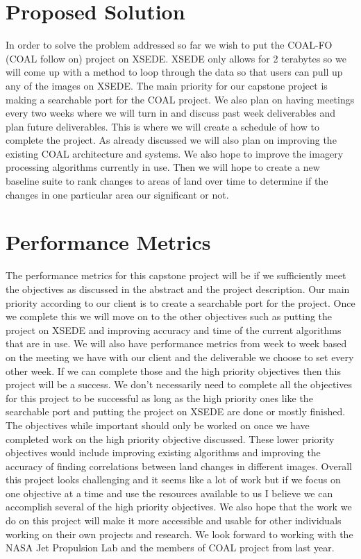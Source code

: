 \documentclass{article}
\begin{document}
\section*{Proposed Solution}
In order to solve the problem addressed so far we wish to put the COAL-FO (COAL
follow on) project on XSEDE. XSEDE only allows for 2 terabytes so we will come
up with a method to loop through the data so that users can pull up any of the
images on XSEDE. The main priority for our capstone project is making a
searchable port for the COAL project. We also plan on having meetings every two
weeks where we will turn in and discuss past week deliverables and plan future
deliverables. This is where we will create a schedule of how to complete the
project. As already discussed we will also plan on improving the existing
COAL architecture and systems. We also hope to improve the imagery processing
algorithms currently in use. Then we will hope to create a new baseline suite
to rank changes to areas of land over time to determine if the changes in one
particular area our significant or not.

\section*{Performance Metrics}
The performance metrics for this capstone project will be if we sufficiently
meet the objectives as discussed in the abstract and the project description.
Our main priority according to our client is to create a searchable port for
the project. Once we complete this we will move on to the other objectives such
as putting the project on XSEDE and improving accuracy and time of the current
algorithms that are in use. We will also have performance metrics from week to
week based on the meeting we have with our client and the deliverable we choose
to set every other week. If we can complete those and the high priority
objectives then this project will be a success. We don't necessarily need to
complete all the objectives for this project to be successful as long as the
high priority ones like the searchable port and putting the project on XSEDE
are done or mostly finished. The objectives while important should only be
worked on once we have completed work on the high priority objective discussed.
These lower priority objectives would include improving existing algorithms
and improving the accuracy of finding correlations between land changes in
different images. Overall this project looks challenging and it seems like a
lot of work but if we focus on one objective at a time and use the resources
available to us I believe we can accomplish several of the high priority
objectives. We also hope that the work we do on this project will make it more
accessible and usable for other individuals working on their own projects and
research. We look forward to working with the NASA Jet Propulsion Lab and the
members of COAL project from last year.

\end{document}
